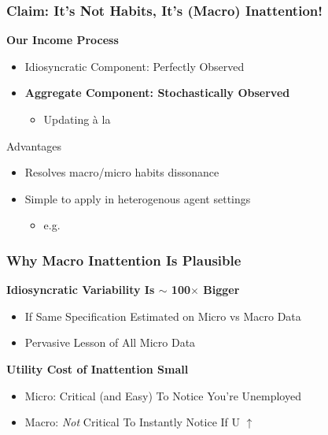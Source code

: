 \documentclass{beamer}\usepackage{dcolumn}
\newcommand{\jbemph}[1]{\textbf{\color{SlideNavy}#1}}
\begin{document}
\begin{frame}
\frametitle{Claim: It's Not Habits, It's (Macro) Inattention! }
\jbemph{\large Our Income Process}
\begin{itemize}
\item   Idiosyncratic Component: Perfectly Observed
\item   \jbemph{Aggregate Component: Stochastically Observed}\\
  \begin{itemize}
\item Updating \`a la \cite{calvoPrices}
  \end{itemize}

\end{itemize}
\begin{block}{ Advantages}
\begin{itemize}
\item Resolves macro/micro habits dissonance
\item Simple to apply in heterogenous agent settings
  \begin{itemize}
	\item e.g. \cite{arsInvestmentInattention}
\end{itemize}
\end{itemize}
\end{block}

\end{frame}

\begin{frame}
\frametitle{Why Macro Inattention Is Plausible}

\begin{block}{\textbf{Idiosyncratic Variability Is $\sim$ 100$\times$ Bigger}}
\begin{itemize}
\item  If Same Specification Estimated on Micro vs Macro Data
\item  Pervasive Lesson of All Micro Data
\end{itemize}
\end{block}

\begin{block}{\textbf{Utility Cost of Inattention Small}}
\begin{itemize}
\item  Micro: Critical (and Easy) To Notice You're Unemployed
\item  Macro: {\it Not} Critical To Instantly Notice If U $\uparrow$
\end{itemize}
\end{block}
\end{frame}
\end{document}
